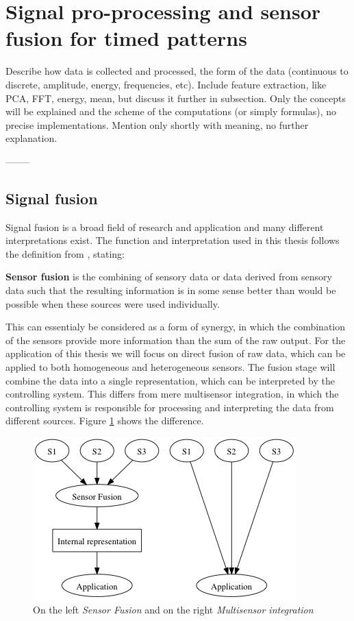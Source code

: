 
\section{Signal pro-processing and sensor fusion for timed patterns}
  Describe how data is collected and processed, the form of the data (continuous to discrete, amplitude, energy, frequencies, etc).
  Include feature extraction, like PCA, FFT, energy, mean, but discuss it further in subsection.
  Only the concepts will be explained and the scheme of the computations (or simply formulas), no precise implementations.
  Mention only shortly with meaning, no further explanation.

  --------


    \subsection{Signal fusion}
    Signal fusion is a broad field of research and application and many different interpretations exist.
    The function and interpretation used in this thesis follows the definition from \cite{elmenreich2001introduction}, stating:
    \begin{center}
      \textbf{Sensor fusion} is the combining of sensory data or data derived from sensory data such that the resulting information is in some sense better than would be possible when these sources were used individually.
    \end{center}
    This can essentialy be considered as a form of synergy, in which the combination of the sensors provide more information than the sum of the raw output.
    For the application of this thesis we will focus on direct fusion of raw data, which can be applied to both homogeneous and heterogeneous sensors.
    The fusion stage will combine the data into a single representation, which can be interpreted by the controlling system.
    This differs from mere multisensor integration, in which the controlling system is responsible for processing and interpreting the data from different sources.
    Figure \ref{fig:sensor_fusion} shows the difference.

    \begin{figure}[htbp]
      \centering
        \includegraphics{./Figures/sensor_fusion.png}
      \caption[K-means]{On the left \emph{Sensor Fusion} and on the right \emph{Multisensor integration}}
      \label{fig:sensor_fusion}
    \end{figure}


